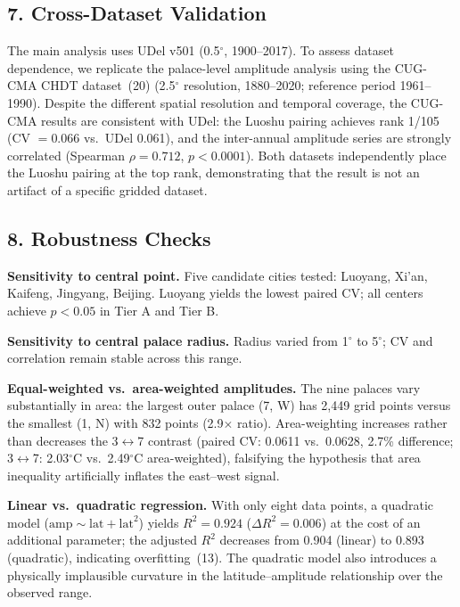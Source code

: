\documentclass[10pt]{article}
\begin{document}
\subsection*{7. Cross-Dataset Validation}

The main analysis uses UDel v501 (0.5$^\circ$, 1900--2017). To assess dataset dependence, we replicate the palace-level amplitude analysis using the CUG-CMA CHDT dataset~(20) (2.5$^\circ$ resolution, 1880--2020; reference period 1961--1990). Despite the different spatial resolution and temporal coverage, the CUG-CMA results are consistent with UDel: the Luoshu pairing achieves rank 1/105 (CV $= 0.066$ vs.\ UDel 0.061), and the inter-annual amplitude series are strongly correlated (Spearman $\rho = 0.712$, $p < 0.0001$). Both datasets independently place the Luoshu pairing at the top rank, demonstrating that the result is not an artifact of a specific gridded dataset.

\subsection*{8. Robustness Checks}

\textbf{Sensitivity to central point.} Five candidate cities tested: Luoyang, Xi'an, Kaifeng, Jingyang, Beijing. Luoyang yields the lowest paired CV; all centers achieve $p < 0.05$ in Tier A and Tier B.

\textbf{Sensitivity to central palace radius.} Radius varied from 1$^\circ$ to 5$^\circ$; CV and correlation remain stable across this range.

\textbf{Equal-weighted vs.\ area-weighted amplitudes.} The nine palaces vary substantially in area: the largest outer palace (7, W) has 2,449 grid points versus the smallest (1, N) with 832 points (2.9$\times$ ratio). Area-weighting increases rather than decreases the 3$\leftrightarrow$7 contrast (paired CV: 0.0611 vs.\ 0.0628, 2.7\% difference; 3$\leftrightarrow$7: 2.03$^\circ$C vs.\ 2.49$^\circ$C area-weighted), falsifying the hypothesis that area inequality artificially inflates the east--west signal.

\textbf{Linear vs.\ quadratic regression.} With only eight data points, a quadratic model ($\text{amp} \sim \text{lat} + \text{lat}^2$) yields $R^2 = 0.924$ ($\Delta R^2 = 0.006$) at the cost of an additional parameter; the adjusted $R^2$ decreases from 0.904 (linear) to 0.893 (quadratic), indicating overfitting~(13). The quadratic model also introduces a physically implausible curvature in the latitude--amplitude relationship over the observed range.
\end{document}
